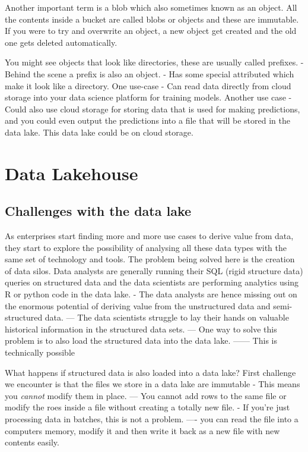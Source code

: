 \documentclass[a4paper, 11pt]{article}
\begin{document}
    Another important term is a blob which also sometimes known as an object.
    All the contents inside a bucket are called blobs or objects and these are immutable.
    If you were to try and overwrite an object, a new object get created and the old one gets deleted automatically.

    You might see objects that look like directories, these are usually called prefixes.
    - Behind the scene a prefix is also an object.
    - Has some special attributed which make it look like a directory.
    One use-case
    - Can read data directly from cloud storage into your data science platform for training models.
    Another use case
    - Could also use cloud storage for storing data that is used for making predictions, and you could even output the predictions into a file that will be stored in the data lake.
    This data lake could be on cloud storage.

    \section{Data Lakehouse}

    \subsection{Challenges with the data lake}

    As enterprises start finding more and more use cases to derive value from data, they start to explore the possibility of analysing all these data types with the same set of technology and tools.
    The problem being solved here is the creation of data silos.
    Data analysts are generally running their SQL (rigid structure data) queries on structured data and the data scientists are performing analytics using R or python code in the data lake.
    - The data analysts are hence missing out on the enormous potential of deriving value from the unstructured data and semi-structured data.
    --- The data scientists struggle to lay their hands on valuable historical information in the structured data sets.
    --- One way to solve this problem is to also load the structured data into the data lake.
    ------ This is technically possible

    What happens if structured data is also loaded into a data lake?
    First challenge we encounter is that the files we store in a data lake are immutable
    - This means you \textit{cannot} modify them in place.
    --- You cannot add rows to the same file or modify the roes inside a file without creating a totally new file.
    - If you're just processing data in batches, this is not a problem.
    ---- you can read the file into a computers memory, modify it and then write it back as a new file with new contents easily.
\end{document}
